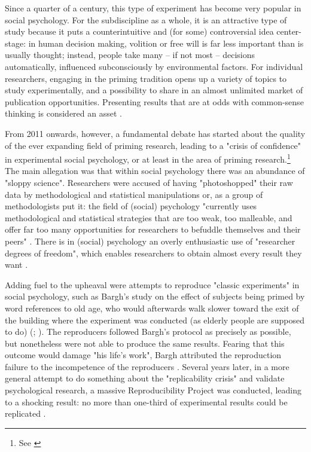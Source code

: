 \documentclass[twocolumn, serif, authordate, reflection]{jote-article}
\begin{document}
Since a quarter of a century, this type of experiment has become very popular in social psychology. For the subdiscipline as a whole, it is an attractive type of study because it puts a counterintuitive and (for some) controversial idea center-stage: in human decision making, volition or free will is far less important than is usually thought; instead, people take many – if not most – decisions automatically, influenced subconsciously by environmental factors. For individual researchers, engaging in the priming tradition opens up a variety of topics to study experimentally, and a possibility to share in an almost unlimited market of publication opportunities. Presenting results that are at odds with common-sense thinking is considered an asset \parencite{Strack2012}. 
 
From 2011 onwards, however, a fundamental debate has started about the quality of the ever expanding field of priming research, leading to a "crisis of confidence" in experimental social psychology, or at least in the area of priming research.\footnote{See \cite[Ch. 9]{Derksen2017}} The main allegation was that within social psychology there was an abundance of "sloppy science". Researchers were accused of having "photoshopped" their raw data by methodological and statistical manipulations or, as a group of methodologists put it: the field of (social) psychology "currently uses methodological and statistical strategies that are too weak, too malleable, and offer far too many opportunities for researchers to befuddle themselves and their peers"  \parencite[p. 178]{Derksen2017}. There is in (social) psychology an overly enthusiastic use of "researcher degrees of freedom", which enables researchers to obtain almost every result they want \parencite{Pashler2012}.

Adding fuel to the upheaval were attempts to reproduce "classic experiments" in social psychology, such as Bargh’s study on the effect of subjects being primed by word references to old age, who would afterwards walk slower toward the exit of the building where the experiment was conducted (as elderly people are supposed to do) (\cite{Bargh1996};  \cite[p. 183-188]{Derksen2017}). The reproducers followed Bargh’s protocol as precisely as possible, but nonetheless were not able to produce the same results. Fearing that this outcome would damage "his life’s work", Bargh attributed the reproduction failure to the incompetence of the reproducers \parencite{Yong2012,Yong2012a}. Several years later, in a more general attempt to do something about the "replicability crisis" and validate psychological research, a massive Reproducibility Project was conducted, leading to a shocking result: no more than one-third of experimental results could be replicated \parencite{OpenScienceCollaboration2015}. 
\end{document}
